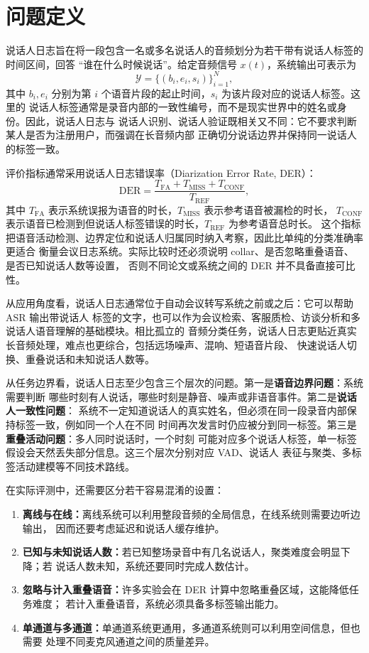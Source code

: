 \documentclass[UTF8,a4paper,10pt]{ctexart}
\begin{document}
\section{问题定义}

说话人日志旨在将一段包含一名或多名说话人的音频划分为若干带有说话人标签的时间区间，回答
“谁在什么时候说话”。给定音频信号 $x(t)$，系统输出可表示为
\[
\mathcal{Y}=\{(b_i,e_i,s_i)\}_{i=1}^{N},
\]
其中 $b_i,e_i$ 分别为第 $i$ 个语音片段的起止时间，$s_i$ 为该片段对应的说话人标签。这里的
说话人标签通常是录音内部的一致性编号，而不是现实世界中的姓名或身份。因此，说话人日志与
说话人识别、说话人验证既相关又不同：它不要求判断某人是否为注册用户，而强调在长音频内部
正确切分说话边界并保持同一说话人的标签一致。

评价指标通常采用说话人日志错误率（Diarization Error Rate, DER）：
\[
\mathrm{DER}=
\frac{T_{\mathrm{FA}}+T_{\mathrm{MISS}}+T_{\mathrm{CONF}}}{T_{\mathrm{REF}}},
\]
其中 $T_{\mathrm{FA}}$ 表示系统误报为语音的时长，$T_{\mathrm{MISS}}$ 表示参考语音被漏检的时长，
$T_{\mathrm{CONF}}$ 表示语音已检测到但说话人标签错误的时长，$T_{\mathrm{REF}}$ 为参考语音总时长。
这个指标把语音活动检测、边界定位和说话人归属同时纳入考察，因此比单纯的分类准确率更适合
衡量会议日志系统。实际比较时还必须说明 collar、是否忽略重叠语音、是否已知说话人数等设置，
否则不同论文或系统之间的 DER 并不具备直接可比性。

从应用角度看，说话人日志通常位于自动会议转写系统之前或之后：它可以帮助 ASR 输出带说话人
标签的文字，也可以作为会议检索、客服质检、访谈分析和多说话人语音理解的基础模块。相比孤立的
音频分类任务，说话人日志更贴近真实长音频处理，难点也更综合，包括远场噪声、混响、短语音片段、
快速说话人切换、重叠说话和未知说话人数等。

从任务边界看，说话人日志至少包含三个层次的问题。第一是\textbf{语音边界问题}：系统需要判断
哪些时刻有人说话，哪些时刻是静音、噪声或非语音事件。第二是\textbf{说话人一致性问题}：
系统不一定知道说话人的真实姓名，但必须在同一段录音内部保持标签一致，例如同一个人在不同
时间再次发言时仍应被分到同一标签。第三是\textbf{重叠活动问题}：多人同时说话时，一个时刻
可能对应多个说话人标签，单一标签假设会天然丢失部分信息。这三个层次分别对应 VAD、说话人
表征与聚类、多标签活动建模等不同技术路线。

在实际评测中，还需要区分若干容易混淆的设置：
\begin{enumerate}
  \item \textbf{离线与在线：}离线系统可以利用整段音频的全局信息，在线系统则需要边听边输出，
  因而还要考虑延迟和说话人缓存维护。
  \item \textbf{已知与未知说话人数：}若已知整场录音中有几名说话人，聚类难度会明显下降；若
  说话人数未知，系统还要同时完成人数估计。
  \item \textbf{忽略与计入重叠语音：}许多实验会在 DER 计算中忽略重叠区域，这能降低任务难度；
  若计入重叠语音，系统必须具备多标签输出能力。
  \item \textbf{单通道与多通道：}单通道系统更通用，多通道系统则可以利用空间信息，但也需要
  处理不同麦克风通道之间的质量差异。
\end{enumerate}
\end{document}

